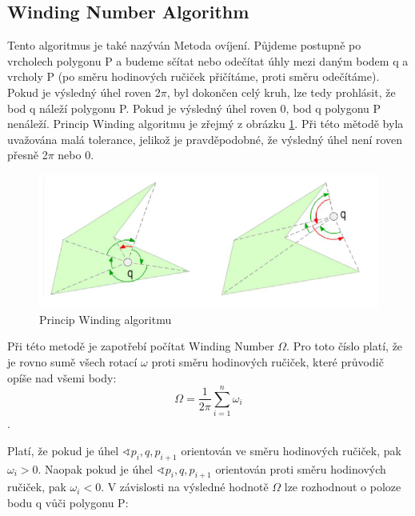 \documentclass[a4paper,11pt,twoside]{article}
\begin{document}
\newpage
\vspace*{-1cm}
\subsection{Winding Number Algorithm}
\large
\noindent Tento algoritmus je také nazýván Metoda ovíjení. Půjdeme postupně po vrcholech polygonu P a budeme sčítat nebo odečítat úhly mezi daným bodem q a vrcholy P (po směru hodinových ručiček přičítáme, proti směru odečítáme). Pokud je výsledný úhel roven 2$\pi$, byl dokončen celý kruh, lze tedy prohlásit, že bod q náleží polygonu P. Pokud je výsledný úhel roven 0, bod q polygonu P nenáleží. Princip Winding algoritmu je zřejmý z obrázku \ref{fig:winding}. Při této mětodě byla uvažována malá tolerance, jelikož je pravděpodobné, že výsledný úhel není roven přesně 2$\pi$ nebo 0.

\vspace{0.2cm}
\begin{figure}[hbt!] 
\begin{center}
\includegraphics[width=15cm]{pictures/winding.png} 
\caption[Princip Winding algoritmu]{Princip Winding algoritmu \cite{winding}}
\label{fig:winding}
\end{center}
\end{figure}
\vspace{-0.4cm}

\noindent Při této metodě je zapotřebí počítat Winding Number $\Omega$. Pro toto číslo platí, že je rovno sumě všech rotací $\omega$ proti směru hodinových ručiček, které průvodič opíše nad všemi body: 
$$ 
\Omega = \frac{1}{2\pi} \sum_{i=1}^n \omega_i
$$.

\noindent Platí, že pokud je úhel $\sphericalangle p_i, q, p_{i+1}$ orientován ve směru hodinových ručiček, pak $\omega_i > 0$.
Naopak pokud je úhel $\sphericalangle p_i, q, p_{i+1}$ orientován proti směru hodinových ručiček, pak $\omega_i < 0$.
V závislosti na výsledné hodnotě $\Omega$ lze rozhodnout o poloze bodu q vůči polygonu P:
\end{document}
